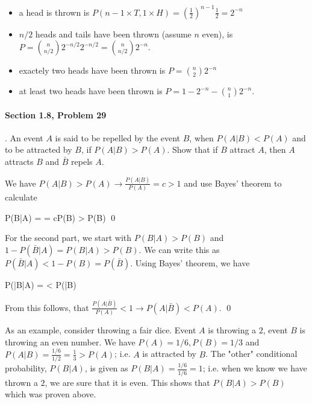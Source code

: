 \begin{itemize}

\item a head is thrown is $P( n-1 \times T, 1 \times H) = \left(\frac{1}{2}\right)^{n-1} \frac{1}{2} = 2^{-n}$

\item $n/2$ heads and tails have been thrown (assume $n$ even), is $P = {n \choose n/2} 2^{-n/2} 2^{-n/2} = {n \choose n/2}2^{-n}$.

\item exactely two heads have been thrown is $P = {n \choose 2} 2^{-n}$

\item at least two heads have been thrown is $P = 1 - 2^{-n} - {n \choose 1} 2^{-n}$.
  
\end{itemize}


\paragraph{Section 1.8, Problem 29}. An event $A$ is said to be repelled by the event $B$, when $P(A|B) < P(A)$ and to be attracted by $B$, if $P(A|B) > P(A)$. Show that if $B$ attract $A$, then $A$ attracts $B$ and $\bar{B}$ repels $A$.

We have $P(A|B) > P(A) \rightarrow \frac{P(A|B)}{P(A)} = c > 1$ and use Bayes' theorem to calculate

\bee
P(B|A) =  = cP(B) > P(B) \qed
\eee

For the second part, we start with $P(B|A)>P(B)$ and $1 - P(\bar{B}|A) = P(B|A) > P(B)$. We can write this as $P(\bar{B}|A) < 1-P(B) = P(\bar{B})$. Using Bayes' theorem, we have

\bee
P(\bar{B}|A) =  < P(\bar{B})
\eee

From this follows, that $\frac{P(A|\bar{B})}{P(A)} < 1 \rightarrow P(A|\bar{B}) < P(A)$. \qed

As an example, consider throwing a fair dice. Event $A$ is throwing a $2$, event $B$ is throwing an even number. We have $P(A) = 1/6, P(B) = 1/3$ and $P(A|B) = \frac{1/6}{1/2} = \frac{1}{3} > P(A)$; i.e. $A$ is attracted by $B$. The "other" conditional probability, $P(B|A)$, is given as $P(B|A) = \frac{1/6}{1/6} = 1$; i.e. when we know we have thrown a $2$, we are sure that it is even. This shows that $P(B|A) > P(B)$ which was proven above.

